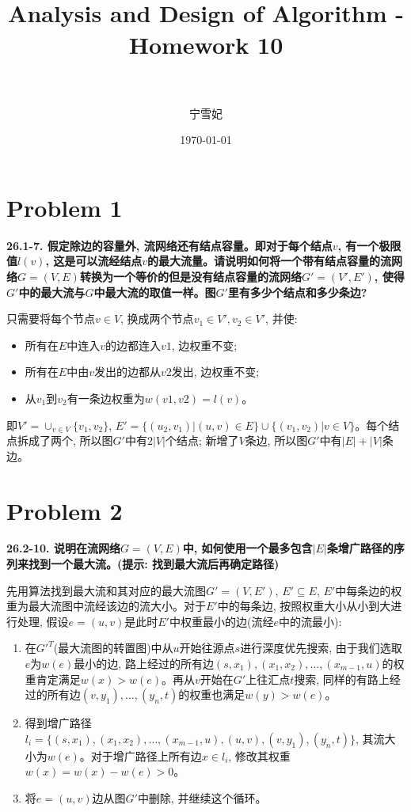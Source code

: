 \documentclass[paper=a4, fontsize=11pt]{scrartcl} %
\title{	
\normalfont \normalsize 
\horrule{0.5pt} \\[0.4cm] %
\huge Analysis and Design of Algorithm - Homework 10\\ %
\horrule{2pt} \\[0.5cm] %
}
\author{宁雪妃} %
\date{\normalsize\today} %
\numberwithin{equation}{section} %
\numberwithin{figure}{section} %
\numberwithin{table}{section} %
\begin{document}
\maketitle %

\section{Problem 1}
\textbf{26.1-7. 假定除边的容量外, 流网络还有结点容量。即对于每个结点$v$, 有一个极限值$l(v)$, 这是可以流经结点$v$的最大流量。请说明如何将一个带有结点容量的流网络$G=(V,E)$转换为一个等价的但是没有结点容量的流网络$G' = (V', E')$, 使得$G'$中的最大流与$G$中最大流的取值一样。图$G'$里有多少个结点和多少条边?}

只需要将每个节点$v \in V$, 换成两个节点$v_1 \in V', v_2 \in V'$, 并使:
\begin{itemize}
\item 所有在$E$中连入$v$的边都连入$v1$, 边权重不变;
\item 所有在$E$中由$v$发出的边都从$v2$发出, 边权重不变;
\item 从$v_1$到$v_2$有一条边权重为$w(v1, v2) = l(v)$。
\end{itemize}

即$V' = \cup_{v \in V} \{v_1, v_2\}$, $E' = \{(u_2, v_1) | (u, v) \in E\} \cup \{(v_1, v_2) | v \in V\}$。每个结点拆成了两个, 所以图$G'$中有$2|V|$个结点; 新增了$V$条边, 所以图$G'$中有$|E| + |V|$条边。

\section{Problem 2}
\textbf{26.2-10. 说明在流网络$G = (V, E)$中, 如何使用一个最多包含$|E|$条增广路径的序列来找到一个最大流。(提示: 找到最大流后再确定路径)}

先用算法找到最大流和其对应的最大流图$G' = (V, E')$, $E' \subseteq E$, $E'$中每条边的权重为最大流图中流经该边的流大小。对于$E'$中的每条边, 按照权重大小从小到大进行处理, 假设$e = (u, v)$是此时$E'$中权重最小的边(流经$e$中的流最小):

\begin{enumerate}
\item 在$G'^T$(最大流图的转置图)中从$u$开始往源点$s$进行深度优先搜索, 由于我们选取$e$为$w(e)$最小的边, 路上经过的所有边$(s, x_1), (x_1, x_2), \dots, (x_{m-1}, u)$的权重肯定满足$w(x) > w(e)$。再从$v$开始在$G'$上往汇点$t$搜索, 同样的有路上经过的所有边$(v, y_1), \dots, (y_n, t)$的权重也满足$w(y) > w(e)$。
\item 得到增广路径$l_i = \{(s, x_1), (x_1, x_2), \dots, (x_{m-1}, u), (u, v), (v, y_1), (y_n, t)\}$, 其流大小为$w(e)$。对于增广路径上所有边$x \in l_i$, 修改其权重$w(x) = w(x) - w(e) > 0$。
\item 将$e = (u, v)$边从图$G'$中删除, 并继续这个循环。
\end{enumerate}
\end{document}

